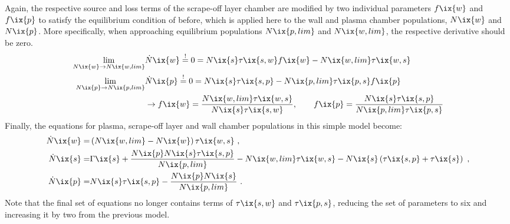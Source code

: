 %
            Again, the respective source and loss terms of the scrape-off layer chamber are modified by two individual parameters $f\ix{w}$ and $f\ix{p}$ to satisfy the equilibrium condition of before, which is applied here to the wall and plasma chamber populations, $N\ix{w}$ and $N\ix{p}$. More specifically, when approaching equilibrium populations $N\ix{p,lim}$ and $N\ix{w,lim}$, the respective derivative should be zero.%
%
            \begin{align}%
                \begin{split}\label{eq:threechamber_limes}%
                    \displaystyle\lim_{N\ix{w}\to N\ix{w,lim}}&\dot{N}\ix{w}\overset{!}{=}0=N\ix{s}\tau\ix{s,w}f\ix{w}-N\ix{w,lim}\tau\ix{w,s}\\%
                    \displaystyle\lim_{N\ix{p}\to N\ix{p,lim}}&\dot{N}\ix{p}\overset{!}{=}0=N\ix{s}\tau\ix{s,p}-N\ix{p,lim}\tau\ix{p,s}f\ix{p}\\%
                    &\rightarrow f\ix{w}=\frac{N\ix{w,lim}\tau\ix{w,s}}{N\ix{s}\tau\ix{s,w}},\qquad f\ix{p}=\frac{N\ix{s}\tau\ix{s,p}}{N\ix{p,lim}\tau\ix{p,s}}%
                \end{split}%
            \end{align}%
%
            Finally, the equations for plasma, scrape-off layer and wall chamber populations in this simple model become:%
%
            \begin{align}%
                \begin{split}\label{eq:threechamber}%
                    \dot{N}\ix{w}=&\left(N\ix{w,lim}-N\ix{w}\right)\tau\ix{w,s}\,\,,\\%
                    \dot{N}\ix{s}=&\Gamma\ix{s}+\frac{N\ix{p}N\ix{s}\tau\ix{s,p}}{N\ix{p,lim}}-N\ix{w,lim}\tau\ix{w,s}-N\ix{s}\left(\tau\ix{s,p}+\tau\ix{s}\right)\,\,,\\%
                    \dot{N}\ix{p}=&N\ix{s}\tau\ix{s,p}-\frac{N\ix{p}N\ix{s}}{N\ix{p,lim}}\,\,.%
                \end{split}%
            \end{align}%
%
            Note that the final set of equations no longer contains terms of $\tau\ix{s,w}$ and $\tau\ix{p,s}$, reducing the set of parameters to six and increasing it by two from the previous model.\\%
